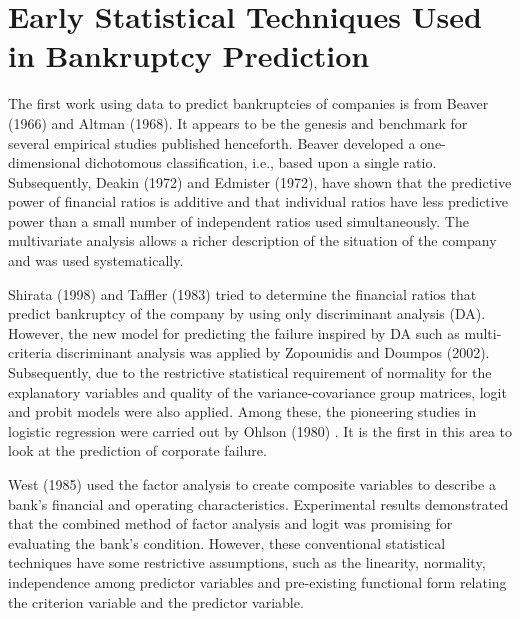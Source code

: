

\section{Early Statistical Techniques Used in Bankruptcy Prediction}

The first work using data to predict bankruptcies of companies is from Beaver (1966)\cite{beaver1967financial} and Altman (1968)\cite{Altman}. It appears to be the genesis and benchmark for several empirical studies published henceforth. Beaver \cite{beaver1967financial} developed a one-dimensional dichotomous classification, i.e., based upon a single ratio. Subsequently, Deakin (1972)\cite{deakin1972discriminant} and Edmister (1972)\cite{edmister1972empirical}, have shown that the predictive power of financial ratios is additive and that individual ratios have less predictive power than a small number of independent ratios used simultaneously. The multivariate analysis allows a richer description of the situation of the company and was used systematically.

Shirata (1998) \cite{shirata1998financial} and Taffler (1983) \cite{taffler1983assessment} tried to determine the financial ratios that predict bankruptcy of the company by using only discriminant analysis (DA). However, the new model for predicting the failure inspired by DA such as multi-criteria discriminant analysis was applied by Zopounidis and Doumpos (2002)\cite{zopounidis2002multi}. 
Subsequently, due to the restrictive statistical requirement of normality for the explanatory variables and quality of the variance-covariance group matrices, logit and probit models were also applied. Among these, the pioneering studies in logistic regression were carried out by Ohlson (1980) \cite{ohlson1980financial}. It is the first in this area to look at the prediction of corporate failure.

West (1985)\cite{west1985factor} used the factor analysis to create composite variables to describe a bank’s financial and operating characteristics. Experimental results demonstrated that the combined method of factor analysis and logit was promising for evaluating the bank's condition.
However, these conventional statistical techniques have some restrictive assumptions, such as the linearity, normality, independence among predictor variables and pre-existing functional form relating the criterion variable and the predictor variable. 

